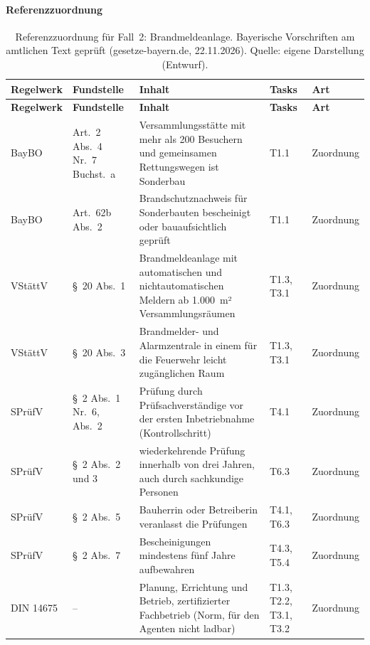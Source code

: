 \paragraph{Referenzzuordnung}
\begin{small}
\begin{longtable}{@{}>{\raggedright\arraybackslash}p{1.9cm}>{\raggedright\arraybackslash}p{2.4cm}>{\raggedright\arraybackslash}p{5.5cm}>{\raggedright\arraybackslash}p{2.4cm}>{\raggedright\arraybackslash}p{2.0cm}@{}}
\caption[Referenzzuordnung für Fall~2: Brandmeldeanlage]{Referenzzuordnung für Fall~2: Brandmeldeanlage. Bayerische Vorschriften am amtlichen Text geprüft (gesetze-bayern.de, 22.11.2026). Quelle: eigene Darstellung (Entwurf).}\label{tab:fall2_referenz}\\
\toprule \textbf{Regelwerk} & \textbf{Fundstelle} & \textbf{Inhalt} & \textbf{Tasks} & \textbf{Art} \\ \midrule \endfirsthead
\toprule \textbf{Regelwerk} & \textbf{Fundstelle} & \textbf{Inhalt} & \textbf{Tasks} & \textbf{Art} \\ \midrule \endhead
\bottomrule \endfoot
BayBO & Art.~2 Abs.~4 Nr.~7 Buchst.~a & Versammlungsstätte mit mehr als 200 Besuchern und gemeinsamen Rettungswegen ist Sonderbau & T1.1 & Zuordnung \\
BayBO & Art.~62b Abs.~2 & Brandschutznachweis für Sonderbauten bescheinigt oder bauaufsichtlich geprüft & T1.1 & Zuordnung \\
VStättV & §~20 Abs.~1 & Brandmeldeanlage mit automatischen und nichtautomatischen Meldern ab 1.000~m² Versammlungsräumen & T1.3, T3.1 & Zuordnung \\
VStättV & §~20 Abs.~3 & Brandmelder- und Alarmzentrale in einem für die Feuerwehr leicht zugänglichen Raum & T1.3, T3.1 & Zuordnung \\
SPrüfV & §~2 Abs.~1 Nr.~6, Abs.~2 & Prüfung durch Prüfsachverständige vor der ersten Inbetriebnahme (Kontrollschritt) & T4.1 & Zuordnung \\
SPrüfV & §~2 Abs.~2 und 3 & wiederkehrende Prüfung innerhalb von drei Jahren, auch durch sachkundige Personen & T6.3 & Zuordnung \\
SPrüfV & §~2 Abs.~5 & Bauherrin oder Betreiberin veranlasst die Prüfungen & T4.1, T6.3 & Zuordnung \\
SPrüfV & §~2 Abs.~7 & Bescheinigungen mindestens fünf Jahre aufbewahren & T4.3, T5.4 & Zuordnung \\
DIN 14675 & -- & Planung, Errichtung und Betrieb, zertifizierter Fachbetrieb (Norm, für den Agenten nicht ladbar) & T1.3, T2.2, T3.1, T3.2 & Zuordnung \\

\end{longtable}
\end{small}
